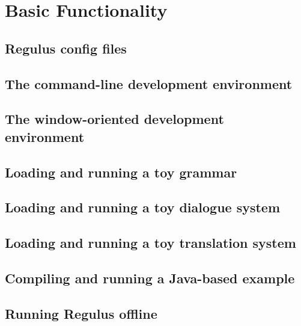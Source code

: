 \chapter{Basic Functionality}
\label{Chapter:BasicFunctionality}

\author{Manny Rayner}

\section{Regulus config files}
\label{Section:ConfigFile}

\section{The command-line development environment}
\label{Section:CommandLineIntro}

\section{The window-oriented development environment}
\label{Section:RegulusGUIIntro}

\section{Loading and running a toy grammar}
\label{Section:ToyGrammar}

\section{Loading and running a toy dialogue system}
\label{Section:ToyDialogueSystem}

\section{Loading and running a toy translation system}
\label{Section:ToyTranslationSystem}

\section{Compiling and running a Java-based example}
\label{Section:ToyJavaSystem}

\section{Running Regulus offline}
\label{Section:RegulusBatch}
